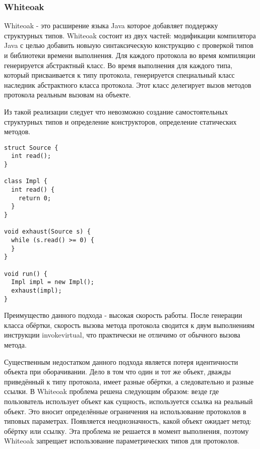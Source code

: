 \subsubsection{Whiteoak}
Whiteoak - это расширение языка Java которое добавляет поддержку структурных типов\cite{whiteoak}. Whiteoak состоит из двух частей: модификации компилятора Java с целью добавить новыую синтаксическую конструкцию с проверкой типов и библиотеки времени выполнения. Для каждого протокола во время компиляции генерируется абстрактный класс. Во время выполнения для каждого типа, который присваивается к типу протокола, генерируется специальный класс наследник абстрактного класса протокола. Этот класс делегирует вызов методов протокола реальным вызовам на объекте.

Из такой реализации следует что невозможно создание самостоятельных структурных типов и определение конструкторов, определение статических методов.

\begin{verbatim}
struct Source {
  int read();
}

class Impl {
  int read() {
    return 0;
  }
}

void exhaust(Source s) {
  while (s.read() >= 0) {
  }
}

void run() {
  Impl impl = new Impl();
  exhaust(impl);
}

\end{verbatim}

Преимущество данного подхода - высокая скорость работы. После генерации класса обёртки, скорость вызова метода протокола сводится к двум выполнениям инструкции invokevirtual, что практически не отличимо от обычного вызова метода.

Существенным недостатком данного подхода является потеря идентичности объекта при оборачивании. Дело в том что один и тот же объект, дважды приведённый к типу протокола, имеет разные обёртки, а следовательно и разные ссылки. В Whiteoak проблема решена следующим образом: везде где пользователь использует объект как сущность, используется ссылка на реальный объект. Это вносит определённые ограничения на использование протоколов в типовых параметрах. Появляется неоднозначность, какой объект ожидает метод: обёртку или ссылку. Эта проблема не решается в момент выполнения, поэтому Whiteoak запрещает использование параметрических типов для протоколов.
